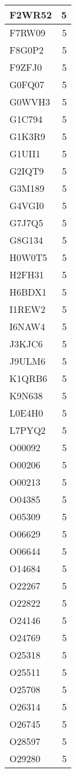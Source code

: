 \documentclass[
]{book}
\theoremstyle{definition}
\theoremstyle{definition}
\theoremstyle{definition}
\theoremstyle{definition}
\theoremstyle{remark}
\begin{document}
\begin{table}
\begin{tabular}{l|r}
\hline
F2WR52 & 5\\
\hline
F7RW09 & 5\\
\hline
F8G0P2 & 5\\
\hline
F9ZFJ0 & 5\\
\hline
G0FQ07 & 5\\
\hline
G0WVH3 & 5\\
\hline
G1C794 & 5\\
\hline
G1K3R9 & 5\\
\hline
G1UII1 & 5\\
\hline
G2IQT9 & 5\\
\hline
G3M189 & 5\\
\hline
G4VGI0 & 5\\
\hline
G7J7Q5 & 5\\
\hline
G8G134 & 5\\
\hline
H0W0T5 & 5\\
\hline
H2FH31 & 5\\
\hline
H6BDX1 & 5\\
\hline
I1REW2 & 5\\
\hline
I6NAW4 & 5\\
\hline
J3KJC6 & 5\\
\hline
J9ULM6 & 5\\
\hline
K1QRB6 & 5\\
\hline
K9N638 & 5\\
\hline
L0E4H0 & 5\\
\hline
L7PYQ2 & 5\\
\hline
O00092 & 5\\
\hline
O00206 & 5\\
\hline
O00213 & 5\\
\hline
O04385 & 5\\
\hline
O05309 & 5\\
\hline
O06629 & 5\\
\hline
O06644 & 5\\
\hline
O14684 & 5\\
\hline
O22267 & 5\\
\hline
O22822 & 5\\
\hline
O24146 & 5\\
\hline
O24769 & 5\\
\hline
O25318 & 5\\
\hline
O25511 & 5\\
\hline
O25708 & 5\\
\hline
O26314 & 5\\
\hline
O26745 & 5\\
\hline
O28597 & 5\\
\hline
O29280 & 5\\

\end{tabular}
\end{table}
\end{document}
